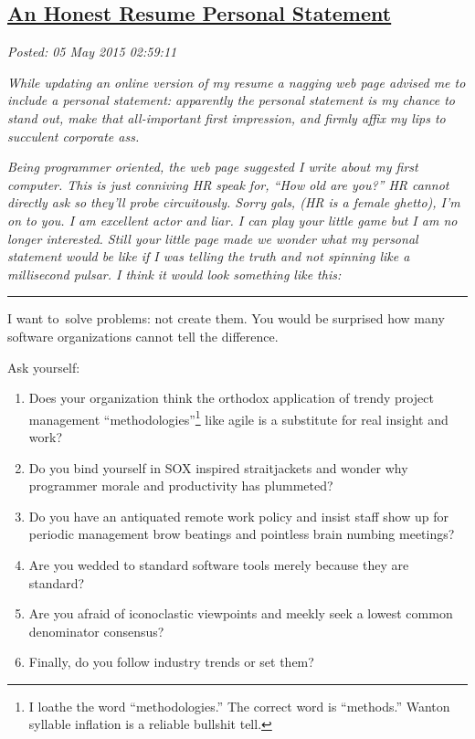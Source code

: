 %

\subsection*{\href{https://bakerjd99.wordpress.com/2015/05/04/an-honest-resume-personal-statement/}{An Honest Resume Personal Statement}}


\noindent\emph{Posted: 05 May 2015 02:59:11}
\vspace{6pt}

\emph{While updating an online version of my resume a nagging web page
advised me to include a personal statement: apparently the personal
statement is my chance to stand out, make that all-important first
impression, and firmly affix my lips to succulent corporate ass.}

\emph{Being programmer oriented, the web page suggested I write about my
first computer. This is just conniving HR speak for, ``How old are you?'' HR
cannot directly ask so they'll probe circuitously. Sorry gals, (HR is a
female ghetto), I'm on to you. I am excellent actor and liar. I can play
your little game but I am no longer interested. Still your little page
made we wonder what my personal statement would be like if I was telling
the truth and not spinning like a millisecond pulsar. I think it would
look something like this:}

\begin{center}\rule{0.5\linewidth}{\linethickness}\end{center}

I want to~solve problems: not create them. You would be surprised how
many software organizations cannot tell the difference.

Ask yourself:

\begin{enumerate}
\itemsep2pt\parskip0pt
\item
  Does your organization think the orthodox application of trendy
  project management
  ``methodologies''\footnote{I loathe the word ``methodologies.'' The correct word is ``methods.''
  Wanton syllable inflation is a reliable bullshit tell.} %
  like agile is a substitute for real insight and work?
\item
  Do you bind yourself in SOX inspired straitjackets and wonder why
  programmer morale and productivity has plummeted?
\item
  Do you have an antiquated remote work policy and insist staff show up
  for periodic management brow beatings and pointless brain numbing
  meetings?
\item
  Are you wedded to standard software tools merely because they are
  standard?
\item
  Are you afraid of iconoclastic viewpoints and meekly seek a lowest
  common denominator consensus?
\item
  Finally, do you follow industry trends or set them?
\end{enumerate}

